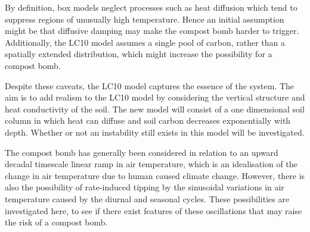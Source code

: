 By definition, box models neglect processes such as heat diffusion which tend to suppress regions of unusually high temperature. Hence an initial assumption might be
that diffusive damping may make the compost bomb harder to trigger. Additionally, the LC10 model assumes a single pool of carbon, rather than a spatially extended distribution, which might
increase the possibility for a compost bomb.

Despite these caveats, the LC10 model captures the essence of the system. The aim is to add realism to the LC10 model by considering the vertical structure and heat conductivity of the soil.
The new model will consist of a one dimensional soil column in which heat can diffuse and soil carbon
decreases exponentially with depth. Whether or not an instability still exists in this model will be investigated.

The compost bomb has generally been considered in relation to an upward decadal timescale linear ramp in air temperature, which is an idealisation of the change in air temperature due to
human caused climate change. However, there is also the possibility of
rate-induced tipping by the sinusoidal variations in air temperature caused by the diurnal and seasonal cycles. These possibilities are investigated here, to see if there exist
features of these oscillations that may raise the risk of a compost bomb.


